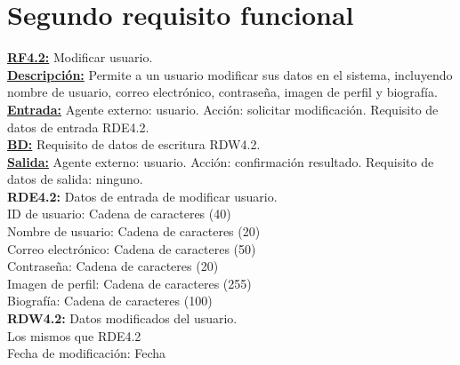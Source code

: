 \section{Segundo requisito funcional}
\textbf{\textcolor{rojo}{\underline{RF4.2:}}} Modificar usuario. \\[6pt]

\textbf{\textcolor{rojo}{\underline{Descripción:}}} Permite a un usuario modificar sus datos en el sistema, incluyendo nombre de usuario, correo electrónico, contraseña, imagen de perfil y biografía. \\[6pt]

\textbf{\textcolor{rojo}{\underline{Entrada:}}} Agente externo: usuario. Acción: solicitar modificación. 
Requisito de datos de entrada \textcolor{azul}{RDE4.2}. \\[6pt]

\textbf{\textcolor{rojo}{\underline{BD:}}} Requisito de datos de escritura \textcolor{azul}{RDW4.2}. \\[6pt]

\textbf{\textcolor{rojo}{\underline{Salida:}}} Agente externo: usuario. Acción: confirmación resultado. 
Requisito de datos de salida: ninguno. \\[12pt]


\textcolor{azul}{\textbf{RDE4.2:}} Datos de entrada de modificar usuario. \\[4pt]
\hspace*{1cm} ID de usuario: Cadena de caracteres (40)\\
\hspace*{1cm} Nombre de usuario: Cadena de caracteres (20)\\
\hspace*{1cm} Correo electrónico: Cadena de caracteres (50)\\
\hspace*{1cm} Contraseña: Cadena de caracteres (20)\\
\hspace*{1cm} Imagen de perfil: Cadena de caracteres (255)\\
\hspace*{1cm} Biografía: Cadena de caracteres (100)\\[8pt]

\textcolor{azul}{\textbf{RDW4.2:}} Datos modificados del usuario. \\[4pt]
\hspace*{1cm} Los mismos que RDE4.2\\
\hspace*{1cm} Fecha de modificación: Fecha\\
\newpage

